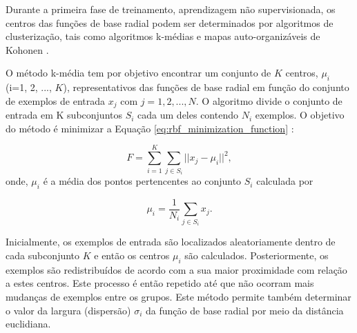 Durante a primeira fase de treinamento, aprendizagem não supervisionada, os centros das funções de base radial podem ser determinados por algoritmos de clusterização, tais como algoritmos k-médias \cite{musavi1992training} e mapas auto-organizáveis de Kohonen \cite{valenca1995fundamentos}.

O método k-média tem por objetivo encontrar um conjunto de $K$ centros, $\mu_i$ (i=1, 2, ..., $K$), representativos das funções de base radial em função do conjunto de exemplos de entrada $x_j$ com $j=1,2,...,N$. O algoritmo divide o conjunto de entrada em K subconjuntos $S_i$ cada um deles contendo $N_i$ exemplos. O objetivo do método é minimizar a Equação \ref{eq:rbf_minimization_function} \label{symbol:funcaoKmedias}:

\begin{equation}
\label{eq:rbf_minimization_function}
F = \sum_{i=1}^{K} \sum_{j \in S_i} || x_j-\mu_i ||^2 ,
\end{equation}
onde, $\mu_i$ é a média dos pontos pertencentes ao conjunto $S_i$ calculada por

\begin{equation}
\label{eq:rbf_mi_i}
\mu_i = \frac{1}{N_i} \sum_{j \in S_i} x_j .
\end{equation}

Inicialmente, os exemplos de entrada são localizados aleatoriamente dentro de cada subconjunto $K$ e então os centros $\mu_i$ \label{symbol:mediaKmedias} são calculados. Posteriormente, os exemplos são redistribuídos de acordo com a sua maior proximidade com relação a estes centros. Este processo é então repetido até que não ocorram mais mudanças de exemplos entre os grupos. Este método permite também determinar o valor da largura (dispersão) $\sigma_i$ da função de base radial por meio da distância euclidiana.

